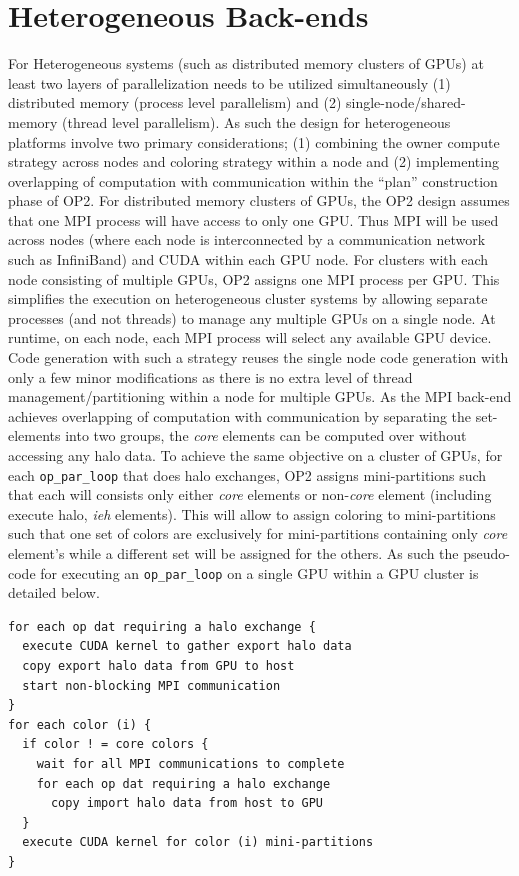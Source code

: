 \documentclass[11pt]{article}
\begin{document}
\newpage
\section{Heterogeneous Back-ends}\label{sec/heterogeneous}

For Heterogeneous systems (such as distributed memory clusters of GPUs) at least two layers of parallelization needs to
be utilized simultaneously (1) distributed memory (process level parallelism) and (2) single-node/shared-memory (thread
level parallelism). As such the design for heterogeneous platforms involve two primary considerations; (1) combining the
owner compute strategy across nodes and coloring strategy within a node and (2) implementing overlapping of computation
with communication within the ``plan'' construction phase of OP2. For distributed memory clusters of GPUs, the OP2
design assumes that one MPI process will have access to only one GPU. Thus MPI will be used across nodes (where each
node is interconnected by a communication network such as InfiniBand) and CUDA within each GPU node. For clusters with
each node consisting of multiple GPUs, OP2 assigns one MPI process per GPU. This simplifies the execution on
heterogeneous cluster systems by allowing separate processes (and not threads) to manage any multiple GPUs on a single
node. At runtime, on each node, each MPI process will select any available GPU device. Code generation with such a
strategy reuses the single node code generation with only a few minor modifications as there is no extra level of thread
management/partitioning within a node for multiple GPUs. As the MPI back-end achieves overlapping of computation with
communication by separating the set-elements into two groups, the \textit{core} elements can be computed over without
accessing any halo data. To achieve the same objective on a cluster of GPUs, for each \texttt{op\_par\_loop} that does
halo exchanges, OP2 assigns mini-partitions such that each will consists only either \textit{core} elements or
non-\textit{core} element (including execute halo, \textit{ieh} elements). This will allow to assign coloring to
mini-partitions such that one set of colors are exclusively for mini-partitions containing only \textit{core} element's
while a different set will be assigned for the others. As such the pseudo-code for executing an \texttt{op\_par\_loop}
on a single GPU within a GPU cluster is detailed below.
\begin{verbatim}
for each op dat requiring a halo exchange {
  execute CUDA kernel to gather export halo data
  copy export halo data from GPU to host
  start non-blocking MPI communication
}
for each color (i) {
  if color ! = core colors {
    wait for all MPI communications to complete
    for each op dat requiring a halo exchange
      copy import halo data from host to GPU
  }
  execute CUDA kernel for color (i) mini-partitions
}
\end{verbatim}
\end{document}
